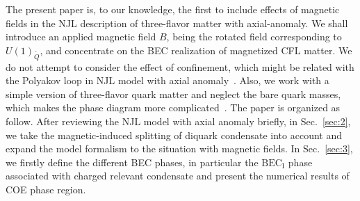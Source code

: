 \documentclass[prd, showpacs,nofootinbib,amsmath,amssymb,12pt]{revtex4}
\begin{document}
The present paper is, to our knowledge, the first to include effects of magnetic fields in the NJL description of three-flavor matter with  axial-anomaly. We shall introduce an applied magnetic field $B$, being the rotated field corresponding to $U(1)_{\widetilde{Q}}$, and concentrate on the BEC realization of magnetized CFL matter.
We do not attempt to consider the effect of confinement, which might be related with the Polyakov loop in NJL model with axial anomaly~\cite{Powell2011Axial}. Also, we work with a simple version of three-flavor quark matter and neglect the bare quark masses, which makes the phase diagram more complicated~\cite{basler2010role}.
The paper is organized as follow. After reviewing the NJL model with axial anomaly briefly, in Sec.~\ref{sec:2}, we take the magnetic-induced splitting of diquark condensate into account and expand the model formalism to the situation with magnetic fields.
In Sec.~\ref{sec:3}, we firstly define the different BEC phases, in particular the $\text{BEC}_\text{I}$ phase associated with charged relevant condensate and present the numerical results of COE phase region.
\end{document}
